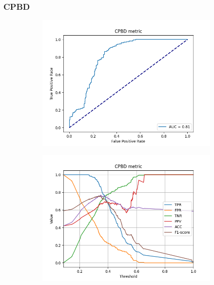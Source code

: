 \subsubsection{CPBD}
\begin{figure}[H]
    \centering
    \begin{subfigure}[t]{0.48\textwidth}
        \includegraphics[width=\textwidth]{Figures/BlurredImages/results_on_thresholds/output_roc_cpbd.png}
        \caption{}
        \label{fig:CPBD_roc}
    \end{subfigure}\hspace{1em}
    \begin{subfigure}[t]{0.48\textwidth}
        \includegraphics[width=\textwidth]{Figures/BlurredImages/results_on_thresholds/threshold_test_scores_cpbd.png}

\end{subfigure}
\end{figure}
